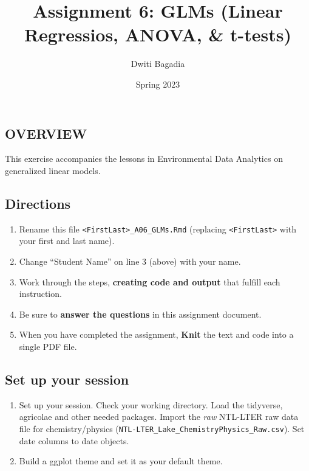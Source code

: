 \documentclass[
]{article}
\title{Assignment 6: GLMs (Linear Regressios, ANOVA, \& t-tests)}
\author{Dwiti Bagadia}
\date{Spring 2023}
\providecommand{\tightlist}{%
  \setlength{\itemsep}{0pt}\setlength{\parskip}{0pt}}
\begin{document}
\maketitle

\hypertarget{overview}{%
\subsection{OVERVIEW}\label{overview}}

This exercise accompanies the lessons in Environmental Data Analytics on
generalized linear models.

\hypertarget{directions}{%
\subsection{Directions}\label{directions}}

\begin{enumerate}
\def\labelenumi{\arabic{enumi}.}
\tightlist
\item
  Rename this file
  \texttt{\textless{}FirstLast\textgreater{}\_A06\_GLMs.Rmd} (replacing
  \texttt{\textless{}FirstLast\textgreater{}} with your first and last
  name).
\item
  Change ``Student Name'' on line 3 (above) with your name.
\item
  Work through the steps, \textbf{creating code and output} that fulfill
  each instruction.
\item
  Be sure to \textbf{answer the questions} in this assignment document.
\item
  When you have completed the assignment, \textbf{Knit} the text and
  code into a single PDF file.
\end{enumerate}

\hypertarget{set-up-your-session}{%
\subsection{Set up your session}\label{set-up-your-session}}

\begin{enumerate}
\def\labelenumi{\arabic{enumi}.}
\item
  Set up your session. Check your working directory. Load the tidyverse,
  agricolae and other needed packages. Import the \emph{raw} NTL-LTER
  raw data file for chemistry/physics
  (\texttt{NTL-LTER\_Lake\_ChemistryPhysics\_Raw.csv}). Set date columns
  to date objects.
\item
  Build a ggplot theme and set it as your default theme.
\end{enumerate}
\end{document}
